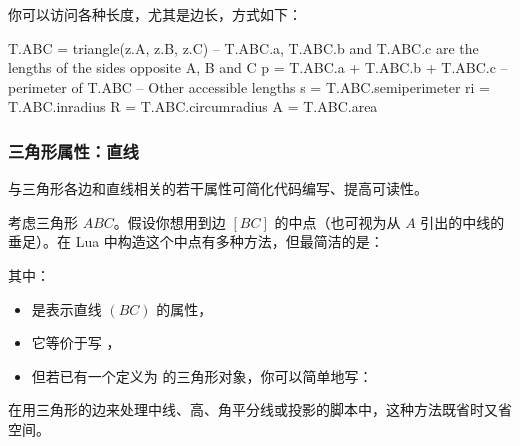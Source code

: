 你可以访问各种长度，尤其是边长，方式如下：
\begin{mybox}
\begin{tkzexample}
  T.ABC = triangle(z.A, z.B, z.C)
  -- T.ABC.a, T.ABC.b and T.ABC.c are the lengths of the sides opposite A, B and C
  p = T.ABC.a + T.ABC.b + T.ABC.c -- perimeter of T.ABC
  -- Other accessible lengths
  s = T.ABC.semiperimeter
  ri = T.ABC.inradius
  R = T.ABC.circumradius
  A = T.ABC.area
\end{tkzexample}
\end{mybox}

\subsubsection{三角形属性：直线}
\label{ssub:triangle_attributes_straight_lines}

与三角形各边和直线相关的若干属性可简化代码编写、提高可读性。

\medskip

考虑三角形 $ABC$。假设你想用到边 $[BC]$ 的中点（也可视为从 $A$ 引出的中线的垂足）。在 Lua 中构造这个中点有多种方法，但最简洁的是：

\begin{center}
\end{center}


其中：
\begin{itemize}
  \item {} 是表示直线 $(BC)$ 的属性，
  \item 它等价于写 ，
  \item 但若已有一个定义为  的三角形对象，你可以简单地写：
  \begin{center}
  \end{center}
\end{itemize}

\medskip

在用三角形的边来处理中线、高、角平分线或投影的脚本中，这种方法既省时又省空间。

\vspace{1em}

\begin{tkzexample}[latex=.5\textwidth]
\end{tkzexample}

